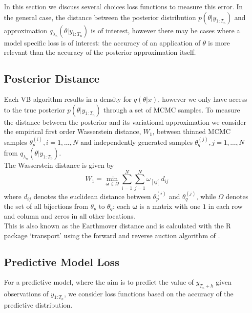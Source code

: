 \documentclass[12pt,a4paper]{article}\usepackage[]{graphicx}\usepackage[]{color}
\begin{document}
In this section we discuss several choices loss functions to measure this error. In the general case, the distance between the posterior distribution $p(\theta | y_{1:T_n})$ and approximation $q_{\lambda_n}(\theta |  y_{1:T_n})$ is of interest, however there may be cases where a model specific loss is of interest: the accuracy of an application of $\theta$ is more relevant than the accuracy of the posterior approximation itself. 


\subsection{Posterior Distance}

Each VB algorithm results in a density for $q(\theta | x)$, however we only have access to the true posterior $p(\theta | y_{1:T_n})$ through a set of MCMC samples. To measure the distance between the posterior and its variational approximation we consider the empirical first order Wasserstein distance, $W_1$, between thinned MCMC samples $\theta^{(i)}_p, i = 1, \dots, N$ and independently generated samples $\theta^{(j)}_q, j = 1, \dots, N$ from $q_{\lambda_n}(\theta |  y_{1:T_n})$.
\\

The Wasserstein distance is given by
\begin{equation}
\label{wasserstein}
W_1 = \underset{\boldsymbol{\omega} \in \Omega}{\min} \sum_{i=1}^N \sum_{j=1}^N \omega_{[ij]} d_{ij}
\end{equation}
where $d_{ij}$ denotes the euclidean distance between $\theta^{(i)}_p$ and $\theta^{(j)}_q$, while $\Omega$ denotes the set of all bijections from $\theta_p$ to $\theta_q$: each $\boldsymbol{\omega}$ is a matrix with one $1$ in each row and column and zeros in all other locations.
\\

This is also known as the Earthmover distance and is calculated with the R package `transport' \citep{transport} using the forward and reverse auction algorithm of \citet{Bertsekas1992}.

\subsection{Predictive Model Loss}

For a predictive model, where the aim is to predict the value of $y_{T_n + h}$ given observations of $y_{1:T_n}$, we consider loss functions based on the accuracy of the predictive distribution.
\end{document}

